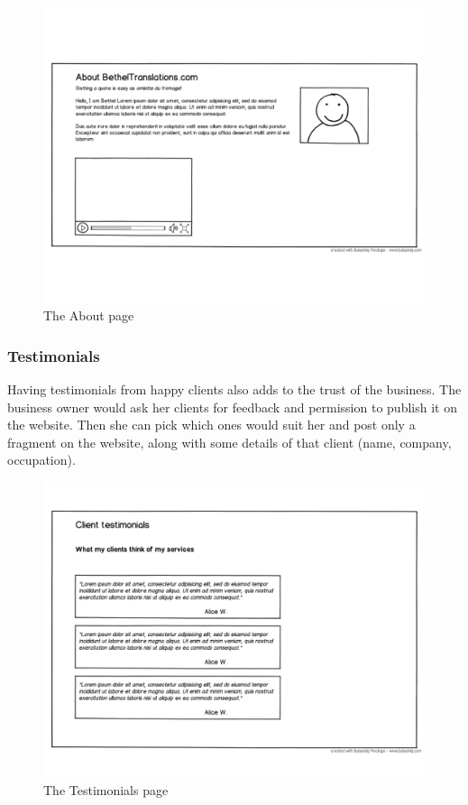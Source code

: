 \documentclass{l3proj}
\begin{document}
\begin{figure}
\label{wireframes:about}
\begin{center}
\includegraphics[width=\linewidth, trim = 0px 110px 0px 100px]{wireframes/about}
\caption{The About page}
\end{center}
\end{figure}


\subsubsection{Testimonials}
Having testimonials from happy clients also adds to the trust of the business.
The business owner would ask her clients for feedback and permission to publish
it on the website. Then she can pick which ones would suit her and post only a
fragment on the website, along with some details of that client (name, company,
occupation).

\begin{figure}
\label{wireframes:testimonials}
\begin{center}
\includegraphics[width=\linewidth, trim = 0px 80px 0px 220px]
	{wireframes/testimonials}
\caption{The Testimonials page}
\end{center}
\end{figure}
\end{document}
